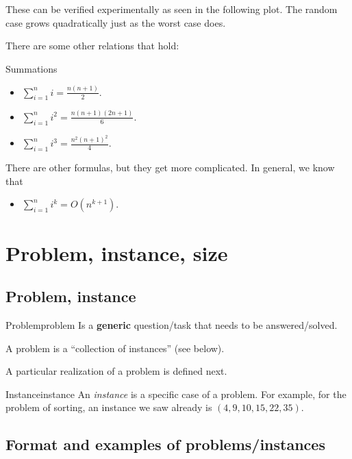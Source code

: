 


These can be verified experimentally  as seen in the following plot.  The random case grows quadratically just as the worst case does.  





There are some other relations that hold:
\begin{theorem}{Summations}{}
\begin{itemize}
\item $
\sum_{i=1}^{n} i = \frac{n(n+1)}{2}.
$
\item $
\sum_{i=1}^{n} i^2 = \frac{n(n+1)(2n+1)}{6}.
$
\item $
\sum_{i=1}^{n} i^3 = \frac{n^2(n+1)^2}{4}.
$
\end{itemize}
There are other formulas, but they get more complicated.  In general, we know that 
\begin{itemize}
\item $\sum_{i=1}^n i^k = O(n^{k+1}).$
\end{itemize}
\end{theorem}



\section{Problem, instance, size}
\subsection{Problem, instance}
\begin{definition}{Problem}{problem}
Is a {\bf generic} question/task that needs to be answered/solved. 

A problem is a ``collection of instances'' (see below).
\end{definition}


A  particular realization of a problem is defined next.

\begin{definition}{Instance}{instance}
An \emph{instance} is a specific case of a problem.  For example, for the problem of sorting, an instance we saw already is $(4,9,10,15,22,35)$.
\end{definition}

\subsection{Format and examples of problems/instances}

